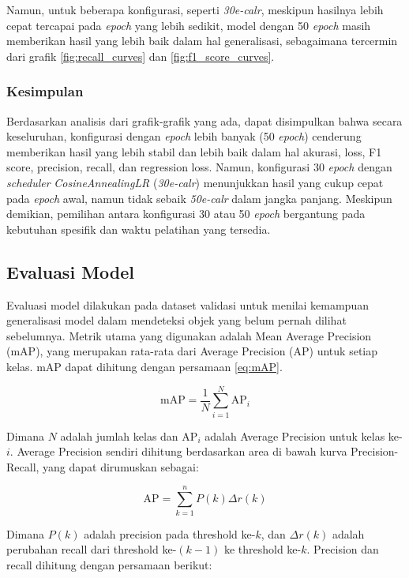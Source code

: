Namun, untuk beberapa konfigurasi, seperti \emph{30e-calr}, meskipun hasilnya lebih cepat tercapai pada \emph{epoch} yang lebih sedikit, model dengan 50 \emph{epoch} masih memberikan hasil yang lebih baik dalam hal generalisasi, sebagaimana tercermin dari grafik \ref{fig:recall_curves} dan \ref{fig:f1_score_curves}.

\subsubsection{Kesimpulan}

Berdasarkan analisis dari grafik-grafik yang ada, dapat disimpulkan bahwa secara keseluruhan, konfigurasi dengan \emph{epoch} lebih banyak (50 \emph{epoch}) cenderung memberikan hasil yang lebih stabil dan lebih baik dalam hal akurasi, loss, F1 score, precision, recall, dan regression loss. Namun, konfigurasi 30 \emph{epoch} dengan \emph{scheduler} \emph{CosineAnnealingLR} (\emph{30e-calr}) menunjukkan hasil yang cukup cepat pada \emph{epoch} awal, namun tidak sebaik \emph{50e-calr} dalam jangka panjang. Meskipun demikian, pemilihan antara konfigurasi 30 atau 50 \emph{epoch} bergantung pada kebutuhan spesifik dan waktu pelatihan yang tersedia.

\subsection{Evaluasi Model}

Evaluasi model dilakukan pada dataset validasi untuk menilai kemampuan generalisasi model dalam mendeteksi objek yang belum pernah dilihat sebelumnya. Metrik utama yang digunakan adalah Mean Average Precision (mAP), yang merupakan rata-rata dari Average Precision (AP) untuk setiap kelas. mAP dapat dihitung dengan persamaan \ref{eq:mAP}.

\begin{equation}
\text{mAP} = \frac{1}{N} \sum_{i=1}^{N} \text{AP}_i
\label{eq:mAP}
\end{equation}

Dimana $N$ adalah jumlah kelas dan $\text{AP}_i$ adalah Average Precision untuk kelas ke-$i$. Average Precision sendiri dihitung berdasarkan area di bawah kurva Precision-Recall, yang dapat dirumuskan sebagai:

\begin{equation}
\text{AP} = \sum_{k=1}^{n} P(k) \Delta r(k)
\label{eq:AP}
\end{equation}

Dimana $P(k)$ adalah precision pada threshold ke-$k$, dan $\Delta r(k)$ adalah perubahan recall dari threshold ke-$(k-1)$ ke threshold ke-$k$. Precision dan recall dihitung dengan persamaan berikut:

